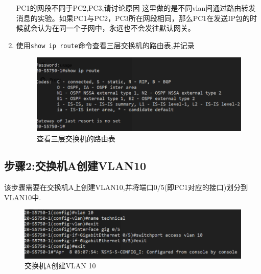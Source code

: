 \documentclass{myreport}
\begin{document}
\begin{enumerate}
    \begin{tcolorbox}[title = {思考}]
    PC1的网段不同于PC2,PC3,请讨论原因
    \tcblower
    这里做的是不同vlan间通过路由转发消息的实验。如果PC1与PC2，PC3所在网段相同，那么PC1在发送IP包的时候就会认为在同一个子网中，永远也不会发往默认网关。
    \end{tcolorbox}
    \item 使用\texttt{show ip route}命令查看三层交换机的路由表,并记录
    \begin{figure}[htp]
        \centering
        \includegraphics[width=13cm]{"./figure/2018-05-17-17-00-58.png"}
        \caption{查看三层交换机的路由表}
        \label{fig:e2-s1-route}
    \end{figure}
    

\end{enumerate}

\subsection{步骤2:交换机A创建VLAN10}

该步骤需要在交换机A上创建VLAN10,并将端口0/5(即PC1对应的接口)划分到VLAN10中.

\begin{figure}[htp]
    \centering
    \includegraphics[width=13cm]{"./figure/2018-05-17-17-03-01.png"}
    \caption{交换机A创建VLAN 10}
    \label{fig:e2-s2-vlan10}
\end{figure}
\end{document}
